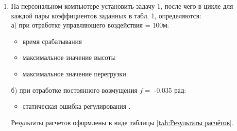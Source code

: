     \begin{enumerate}
    \item На персональном компьютере установить задачу 1, после чего в цикле для
    каждой   пары   коэффициентов  заданных   в  табл.   1,
    определяются:\\
    а)	при отработке управляющего воздействия  = 100м:
        \begin{itemize}
            \item время срабатывания   
            \item максимальное значение высоты  
            \item максимальное значение перегрузки.
        \end{itemize}
    б)	при отработке постоянного возмущения $f=$ -0.035 рад:
        \begin{itemize}
            \item статическая ошибка регулирования .
        \end{itemize}
    
    Результаты расчетов оформлены в виде таблицы \ref{tab:Результаты расчётов}.


\end{enumerate}
